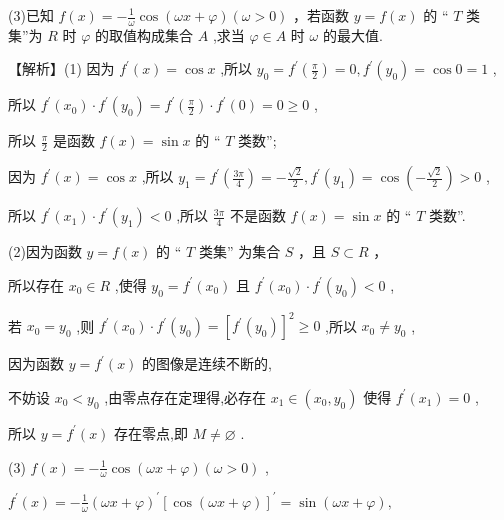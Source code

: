 \documentclass[10pt]{article}
\begin{document}
(3)已知 \(f\left( x\right)  =  - \frac{1}{\omega }\cos \left( {{\omega x} + \varphi }\right) \left( {\omega  > 0}\right)\) ，若函数 \(y = f\left( x\right)\) 的 “ \(T\) 类集”为 \(R\) 时 \(\varphi\) 的取值构成集合 \(A\) ,求当 \(\varphi  \in  A\) 时 \(\omega\) 的最大值.

【解析】(1) 因为 \({f}^{\prime }\left( x\right)  = \cos x\) ,所以 \({y}_{0} = {f}^{\prime }\left( \frac{\pi }{2}\right)  = 0,{f}^{\prime }\left( {y}_{0}\right)  = \cos 0 = 1\) ,

所以 \({f}^{\prime }\left( {x}_{0}\right)  \cdot  {f}^{\prime }\left( {y}_{0}\right)  = {f}^{\prime }\left( \frac{\pi }{2}\right)  \cdot  {f}^{\prime }\left( 0\right)  = 0 \geq  0\) ,

所以 \(\frac{\pi }{2}\) 是函数 \(f\left( x\right)  = \sin x\) 的 “ \(T\) 类数”;

因为 \({f}^{\prime }\left( x\right)  = \cos x\) ,所以 \({y}_{1} = {f}^{\prime }\left( \frac{3\pi }{4}\right)  =  - \frac{\sqrt{2}}{2},{f}^{\prime }\left( {y}_{1}\right)  = \cos \left( {-\frac{\sqrt{2}}{2}}\right)  > 0\) ,

所以 \({f}^{\prime }\left( {x}_{1}\right)  \cdot  {f}^{\prime }\left( {y}_{1}\right)  < 0\) ,所以 \(\frac{3\pi }{4}\) 不是函数 \(f\left( x\right)  = \sin x\) 的 “ \(T\) 类数”.

(2)因为函数 \(y = f\left( x\right)\) 的 “ \(T\) 类集” 为集合 \(S\) ，且 \(S \subset  R\) ，

所以存在 \({x}_{0} \in  R\) ,使得 \({y}_{0} = {f}^{\prime }\left( {x}_{0}\right)\) 且 \({f}^{\prime }\left( {x}_{0}\right)  \cdot  {f}^{\prime }\left( {y}_{0}\right)  < 0\) ,

若 \({x}_{0} = {y}_{0}\) ,则 \({f}^{\prime }\left( {x}_{0}\right)  \cdot  {f}^{\prime }\left( {y}_{0}\right)  = {\left\lbrack  {f}^{\prime }\left( {y}_{0}\right) \right\rbrack  }^{2} \geq  0\) ,所以 \({x}_{0} \neq  {y}_{0}\) ,

因为函数 \(y = {f}^{\prime }\left( x\right)\) 的图像是连续不断的,

不妨设 \({x}_{0} < {y}_{0}\) ,由零点存在定理得,必存在 \({x}_{1} \in  \left( {{x}_{0},{y}_{0}}\right)\) 使得 \({f}^{\prime }\left( {x}_{1}\right)  = 0\) ,

所以 \(y = {f}^{\prime }\left( x\right)\) 存在零点,即 \(M \neq  \varnothing\) .

(3) \(f\left( x\right)  =  - \frac{1}{\omega }\cos \left( {{\omega x} + \varphi }\right) \left( {\omega  > 0}\right)\) ,

\({f}^{\prime }\left( x\right)  =  - \frac{1}{\omega }{\left( \omega x + \varphi \right) }^{\prime }{\left\lbrack  \cos \left( \omega x + \varphi \right) \right\rbrack  }^{\prime } = \sin \left( {{\omega x} + \varphi }\right) ,\)
\end{document}
